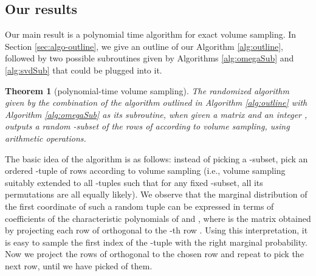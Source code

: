 \documentclass[11pt]{article}
\newtheorem{theorem}{Theorem}
\begin{document}
\subsection{Our results}
Our main result is a polynomial time algorithm for exact volume sampling. In Section \ref{sec:algo-outline}, we give an outline of our Algorithm \ref{alg:outline}, followed by two possible subroutines given by Algorithms  \ref{alg:omegaSub} and \ref{alg:svdSub} that could be plugged into it.

\begin{theorem}[polynomial-time volume sampling]\label{thm:polytimeVS}
The randomized algorithm given by the combination of the algorithm outlined in Algorithm \ref{alg:outline} with Algorithm \ref{alg:omegaSub} as its subroutine, when given a matrix  and an integer , outputs a random -subset of the rows of  according to volume sampling, using  arithmetic operations.
\end{theorem}
The basic idea of the algorithm is as follows: instead of picking a -subset, pick an ordered -tuple of rows according to volume sampling (i.e., volume sampling suitably extended to all -tuples such that for any fixed -subset, all its  permutations are all equally likely). We observe that the marginal distribution of the first coordinate of such a random tuple can be expressed in terms of coefficients of the characteristic polynomials of  and , where  is the matrix obtained by projecting each row of  orthogonal to the -th row . Using this interpretation, it is easy to sample the first index of the -tuple with the right marginal probability. Now we project the rows of  orthogonal to the chosen row and repeat to pick the next row, until we have picked  of them.
\end{document}
